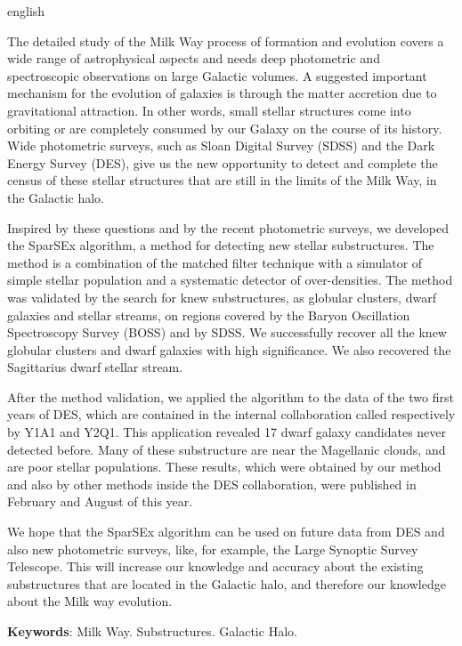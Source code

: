 \documentclass[
	12pt,				%
	openany,			%
	oneside,			%
	a4paper,			%
	english,			%
	brazil				%
	]{abntex2}
\begin{document}
\begin{resumo}[Abstract]
 \begin{otherlanguage*}{english}

\qquad The detailed study of the Milk Way  process of formation and evolution covers a wide range of astrophysical aspects and needs deep photometric and spectroscopic observations on large Galactic volumes. A suggested important mechanism for the evolution of galaxies is through  the matter accretion due to gravitational attraction. In other words, small stellar structures  come into orbiting or are completely consumed by our Galaxy on the course of its history.  Wide photometric surveys, such as Sloan Digital Survey (SDSS)  and  the  Dark Energy Survey (DES), give us the new opportunity to detect and complete the census of these stellar structures that are still in the limits of the Milk Way, in the Galactic halo. \par 
\qquad Inspired by these questions and by the recent photometric surveys, we developed the SparSEx algorithm, a method for detecting new stellar substructures. The method is a combination of the matched filter technique with a simulator of simple stellar population and a systematic detector of over-densities. The method was validated by the search for knew substructures, as globular clusters,  dwarf galaxies and stellar streams,  on regions covered by the Baryon Oscillation Spectroscopy Survey (BOSS) and by SDSS. We successfully recover all the knew globular clusters and dwarf galaxies with high significance. We also recovered  the Sagittarius dwarf stellar stream. \par
\qquad After the method validation, we applied the algorithm to the data of the two first years of DES, which are contained in the internal collaboration called  respectively by Y1A1 and Y2Q1. This application revealed 17 dwarf galaxy candidates never detected before. Many of these substructure are near the Magellanic clouds, and are poor stellar populations. These results, which were obtained by our method and also by other methods inside the DES collaboration, were published in  February and August of this year. \par
\qquad We hope that the SparSEx algorithm can be used on future data from DES and also new photometric surveys,  like, for example, the  Large Synoptic Survey Telescope. This will  increase our knowledge and accuracy about the existing substructures that are located in the Galactic halo, and therefore our knowledge about the Milk way evolution.
   \vspace{\onelineskip}
 
   \noindent 
   \textbf{Keywords}: Milk Way. Substructures. Galactic Halo.
 \end{otherlanguage*}
\end{resumo}
\end{document}

